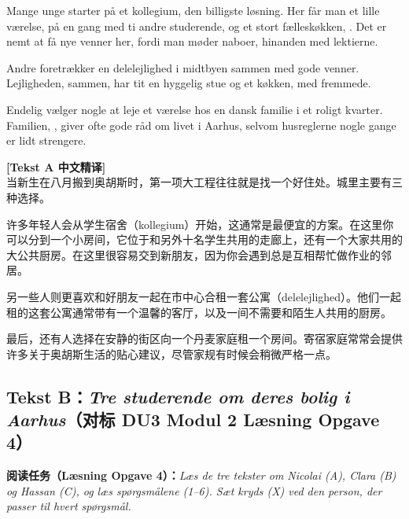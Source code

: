 Mange unge starter på et kollegium,  den billigste løsning. Her får man et lille værelse,  på en gang med ti andre studerende, og et stort fælleskøkken, . Det er nemt at få nye venner her, fordi man møder naboer,  hinanden med lektierne.

Andre foretrækker en delelejlighed i midtbyen sammen med gode venner. Lejligheden,  sammen, har tit en hyggelig stue og et køkken,  med fremmede.

Endelig vælger nogle at leje et værelse hos en dansk familie i et roligt kvarter. Familien, , giver ofte gode råd om livet i Aarhus, selvom husreglerne nogle gange er lidt strengere.

\begin{transbox}
\small
\textbf{\color{NCDTeal}[Tekst A 中文精译]}\\
当新生在八月搬到奥胡斯时，第一项大工程往往就是找一个好住处。城里主要有三种选择。

许多年轻人会从学生宿舍（kollegium）开始，这通常是最便宜的方案。在这里你可以分到一个小房间，它位于和另外十名学生共用的走廊上，还有一个大家共用的大公共厨房。在这里很容易交到新朋友，因为你会遇到总是互相帮忙做作业的邻居。

另一些人则更喜欢和好朋友一起在市中心合租一套公寓（delelejlighed）。他们一起租的这套公寓通常带有一个温馨的客厅，以及一间不需要和陌生人共用的厨房。

最后，还有人选择在安静的街区向一个丹麦家庭租一个房间。寄宿家庭常常会提供许多关于奥胡斯生活的贴心建议，尽管家规有时候会稍微严格一点。
\end{transbox}

\subsection*{Tekst B：\textit{Tre studerende om deres bolig i Aarhus}（对标 DU3 Modul 2 Læsning Opgave 4）}

\textbf{阅读任务（Læsning Opgave 4）：}\textit{Læs de tre tekster om Nicolai (A), Clara (B) og Hassan (C), og læs spørgsmålene (1--6). Sæt kryds (X) ved den person, der passer til hvert spørgsmål.}

